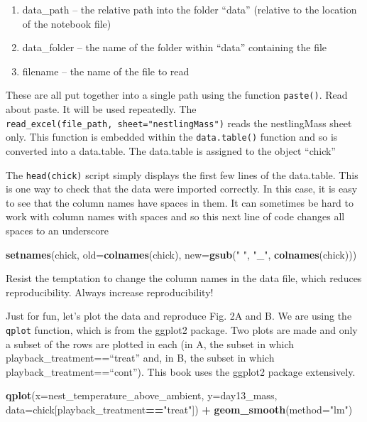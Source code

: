 \documentclass[]{book}
\newenvironment{Shaded}{\begin{snugshade}}{\end{snugshade}}
\newcommand{\KeywordTok}[1]{\textcolor[rgb]{0.13,0.29,0.53}{\textbf{#1}}}
\newcommand{\DataTypeTok}[1]{\textcolor[rgb]{0.13,0.29,0.53}{#1}}
\newcommand{\StringTok}[1]{\textcolor[rgb]{0.31,0.60,0.02}{#1}}
\newcommand{\OperatorTok}[1]{\textcolor[rgb]{0.81,0.36,0.00}{\textbf{#1}}}
\newcommand{\NormalTok}[1]{#1}
\providecommand{\tightlist}{%
  \setlength{\itemsep}{0pt}\setlength{\parskip}{0pt}}
\theoremstyle{definition}
\theoremstyle{definition}
\theoremstyle{definition}
\theoremstyle{remark}
\begin{document}
\begin{enumerate}
\def\labelenumi{\arabic{enumi}.}
\tightlist
\item
  data\_path -- the relative path into the folder ``data'' (relative to
  the location of the notebook file)
\item
  data\_folder -- the name of the folder within ``data'' containing the
  file
\item
  filename -- the name of the file to read
\end{enumerate}

These are all put together into a single path using the function
\texttt{paste()}. Read about paste. It will be used repeatedly. The
\texttt{read\_excel(file\_path,\ sheet="nestlingMass")} reads the
nestlingMass sheet only. This function is embedded within the
\texttt{data.table()} function and so is converted into a data.table.
The data.table is assigned to the object ``chick''

The \texttt{head(chick)} script simply displays the first few lines of
the data.table. This is one way to check that the data were imported
correctly. In this case, it is easy to see that the column names have
spaces in them. It can sometimes be hard to work with column names with
spaces and so this next line of code changes all spaces to an underscore

\begin{Shaded}
\begin{Highlighting}[]
\KeywordTok{setnames}\NormalTok{(chick, }\DataTypeTok{old=}\KeywordTok{colnames}\NormalTok{(chick), }\DataTypeTok{new=}\KeywordTok{gsub}\NormalTok{(}\StringTok{" "}\NormalTok{, }\StringTok{"_"}\NormalTok{, }\KeywordTok{colnames}\NormalTok{(chick)))}
\end{Highlighting}
\end{Shaded}

Resist the temptation to change the column names in the data file, which
reduces reproducibility. Always increase reproducibility!

Just for fun, let's plot the data and reproduce Fig. 2A and B. We are
using the \texttt{qplot} function, which is from the ggplot2 package.
Two plots are made and only a subset of the rows are plotted in each (in
A, the subset in which playback\_treatment==``treat'' and, in B, the
subset in which playback\_treatment==``cont''). This book uses the
ggplot2 package extensively.

\begin{Shaded}
\begin{Highlighting}[]
\KeywordTok{qplot}\NormalTok{(}\DataTypeTok{x=}\NormalTok{nest_temperature_above_ambient, }\DataTypeTok{y=}\NormalTok{day13_mass, }\DataTypeTok{data=}\NormalTok{chick[playback_treatment}\OperatorTok{==}\StringTok{"treat"}\NormalTok{]) }\OperatorTok{+}
\StringTok{  }\KeywordTok{geom_smooth}\NormalTok{(}\DataTypeTok{method=}\StringTok{"lm"}\NormalTok{)}
\end{Highlighting}
\end{Shaded}
\end{document}
